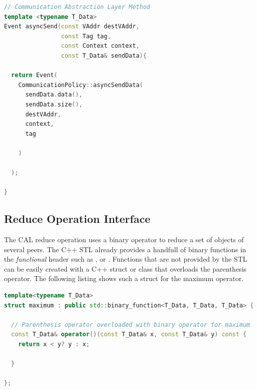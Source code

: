 \begin{minipage}[t]{\textwidth} 
  \begin{lstlisting}[language=C++, breaklines=false,  label={lst:cal_async_send}, caption={Data objects of the template data type \cpp{T\_Data} must provide the methods \cpp{data()} and \cpp{size()} which need to offer the memory pointer and the number of elements.}]
// Communication Abstraction Layer Method
template <typename T_Data>
Event asyncSend(const VAddr destVAddr, 
                const Tag tag, 
                const Context context, 
                const T_Data& sendData){

  return Event(
    CommunicationPolicy::asyncSendData(
      sendData.data(),
      sendData.size(), 
      destVAddr, 
      context, 
      tag
      
    )
      
  );

}
\end{lstlisting}
\end{minipage}

\subsection{Reduce Operation Interface}
The CAL reduce operation uses a binary operator to reduce a set of objects
of several peers. The C++ STL already provides a handfull of binary
functions in the \emph{functional} header such as ,
 or 
\cite{ref:functional}. Functions that are not provided by the STL can
be easily created with a C++ struct or class that overloads the
parenthesis operator. The following listing shows such a struct for
the maximum operator.

\begin{minipage}[t]{\textwidth} 
\begin{lstlisting}[language=C++, breaklines=false, caption={\ }, label={lst:binary_function}, caption={Implementation of the binary operator maximum. These kind of binary operators can be used for the CAL reduce operation.}]
template<typename T_Data>
struct maximum : public std::binary_function<T_Data, T_Data, T_Data> {

  // Parenthesis operator overloaded with binary operator for maximum
  const T_Data& operator()(const T_Data& x, const T_Data& y) const {
    return x < y? y : x;

  }

};
\end{lstlisting}
\end{minipage}%

